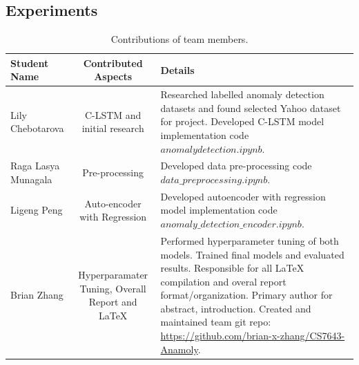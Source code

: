 \documentclass[10pt,twocolumn,letterpaper]{article}
\begin{document}
\subsection*{Experiments}
\begin{table}
\begin{tabular}{|l|c|p{6cm}|}
\hline
Student Name & Contributed Aspects & Details \\
\hline\hline
Lily Chebotarova            & C-LSTM and initial research  & Researched labelled anomaly detection datasets and found selected Yahoo dataset for project. Developed C-LSTM model implementation code \(anomalydetection.ipynb\). \\ \hline 
Raga Lasya Munagala         & Pre-processing & Developed data pre-processing code \(data\_preprocessing.ipynb\). \\ \hline
Ligeng Peng                 & Auto-encoder with Regression  & Developed autoencoder with regression model implementation code \(anomaly\_detection\_encoder.ipynb\). \\ \hline
Brian Zhang                 & Hyperparamater Tuning, Overall Report and LaTeX  & Performed hyperparameter tuning of both models. Trained final models and evaluated results. Responsible for all LaTeX compilation and overal report format/organization. Primary author for abstract, introduction. Created and maintained team git repo: \url{https://github.com/brian-x-zhang/CS7643-Anamoly}. \\ \hline
\hline
\end{tabular}
\caption{Contributions of team members.}
\label{tab:contributions}
\end{table}




{\small


}
\end{document}
